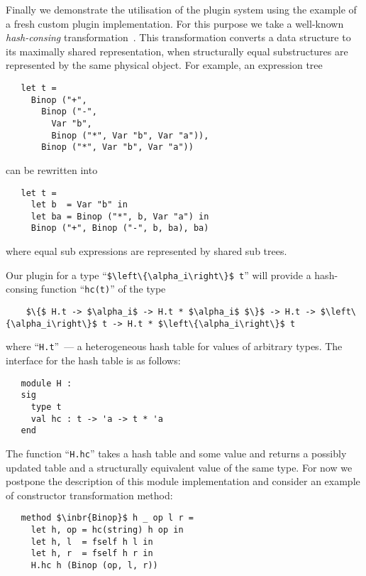 Finally we demonstrate the utilisation of the plugin system using the example of a fresh custom plugin implementation. For this purpose we
take a well-known \emph{hash-consing} transformation~\cite{HC}. This transformation converts a data structure to its maximally shared
representation, when structurally equal substructures are represented by the same physical object. For example, an expression tree

\begin{lstlisting}
   let t =
     Binop ("+",
       Binop ("-",
         Var "b",
         Binop ("*", Var "b", Var "a")),
       Binop ("*", Var "b", Var "a"))
\end{lstlisting}

can be rewritten into

\begin{lstlisting}
   let t =
     let b  = Var "b" in
     let ba = Binop ("*", b, Var "a") in
     Binop ("+", Binop ("-", b, ba), ba)  
\end{lstlisting}

where equal sub expressions are represented by shared sub trees.

Our plugin for a type ``\lstinline|$\left\{\alpha_i\right\}$ t|'' will provide a hash-consing function ``\lstinline{hc(t)}'' of the type

\begin{lstlisting}
    $\{$ H.t -> $\alpha_i$ -> H.t * $\alpha_i$ $\}$ -> H.t -> $\left\{\alpha_i\right\}$ t -> H.t * $\left\{\alpha_i\right\}$ t
\end{lstlisting}

where ``\lstinline{H.t}''~--- a heterogeneous hash table for values of arbitrary types. The interface for the hash table is
as follows:

\begin{lstlisting}
   module H :
   sig
     type t
     val hc : t -> 'a -> t * 'a
   end
\end{lstlisting}

The function ``\lstinline{H.hc}'' takes a hash table and some value and returns a possibly updated table and a structurally equivalent value
of the same type. For now we postpone the description of this module implementation and consider an example of constructor transformation
method:

\begin{lstlisting}   
   method $\inbr{Binop}$ h _ op l r =
     let h, op = hc(string) h op in
     let h, l  = fself h l in
     let h, r  = fself h r in
     H.hc h (Binop (op, l, r))
\end{lstlisting}

